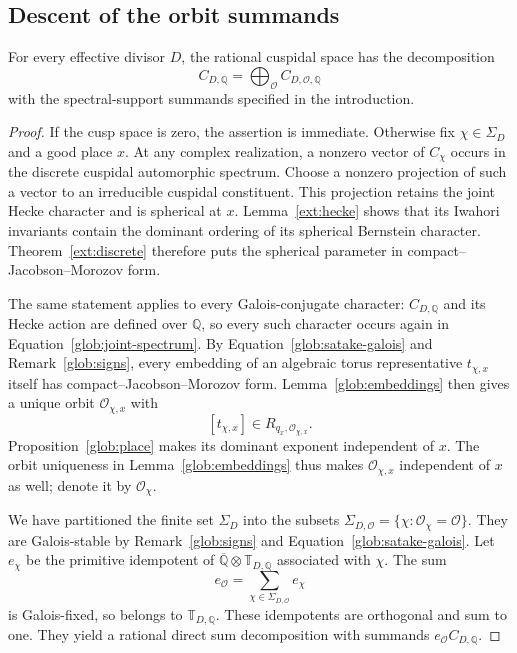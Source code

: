 \subsection{Descent of the orbit summands}

\begin{proposition}\label{glob:descent}
For every effective divisor $D$, the rational cuspidal space has the
decomposition
\begin{equation}\label{glob:rational-decomposition}
             C_{D,\mathbb Q}
                 =\bigoplus_{\mathcal O}C_{D,\mathcal O,\mathbb Q}
\end{equation}
with the spectral-support summands specified in the introduction.
\end{proposition}

\begin{proof}
If the cusp space is zero, the assertion is immediate.  Otherwise
fix $\chi\in\Sigma_D$ and a good place $x$.  At any complex
realization, a nonzero vector of $C_\chi$ occurs in the discrete
cuspidal automorphic spectrum.  Choose a nonzero projection of such a vector to an irreducible
cuspidal constituent.  This projection retains the joint Hecke
character and is spherical at $x$.
Lemma~\ref{ext:hecke} shows that its Iwahori invariants contain the
dominant ordering of its spherical Bernstein character.
Theorem~\ref{ext:discrete} therefore puts the spherical parameter
in compact--Jacobson--Morozov form.

The same statement applies to every Galois-conjugate character:
$C_{D,\mathbb Q}$ and its Hecke action are defined over $\mathbb Q$,
so every such character occurs again in
Equation~\eqref{glob:joint-spectrum}.  By
Equation~\eqref{glob:satake-galois} and Remark~\ref{glob:signs}, every
embedding of an algebraic torus representative $t_{\chi,x}$ itself
has compact--Jacobson--Morozov form.  Lemma~\ref{glob:embeddings}
then gives a unique orbit $\mathcal O_{\chi,x}$ with
\[
                [t_{\chi,x}]\in R_{q_x,\mathcal O_{\chi,x}}.
\]
Proposition~\ref{glob:place} makes its dominant exponent independent
of $x$.  The orbit uniqueness in Lemma~\ref{glob:embeddings} thus
makes $\mathcal O_{\chi,x}$ independent of $x$ as well; denote it
by $\mathcal O_\chi$.

We have partitioned the finite set $\Sigma_D$ into the subsets
$\Sigma_{D,\mathcal O}=\{\chi:\mathcal O_\chi=\mathcal O\}$.
They are Galois-stable by Remark~\ref{glob:signs} and
Equation~\eqref{glob:satake-galois}.  Let $e_\chi$ be the primitive
idempotent of
$\overline{\mathbb Q}\otimes\mathbb T_{D,\mathbb Q}$ associated
with $\chi$.  The sum
\[
            e_{\mathcal O}
                 =\sum_{\chi\in\Sigma_{D,\mathcal O}}e_\chi
\]
is Galois-fixed, so belongs to $\mathbb T_{D,\mathbb Q}$.
These idempotents are orthogonal and sum to one.  They yield a
rational direct sum decomposition with summands
$e_{\mathcal O}C_{D,\mathbb Q}$.


\end{proof}
